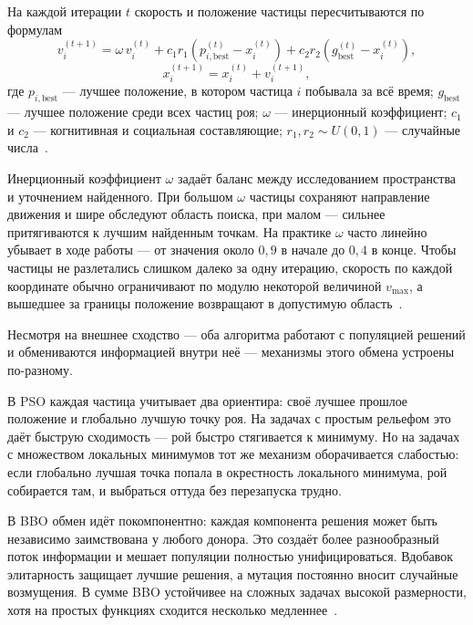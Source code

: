 \documentclass[14pt, a4paper]{extarticle}
\begin{document}
На каждой итерации $t$ скорость и положение частицы пересчитываются по формулам
\begin{equation}\label{eq:pso-velocity}
  v_i^{(t+1)} = \omega\, v_i^{(t)}
  + c_1 r_1 \!\left(p_{i,\text{best}}^{(t)} - x_i^{(t)}\right)
  + c_2 r_2 \!\left(g_{\text{best}}^{(t)} - x_i^{(t)}\right),
\end{equation}
\begin{equation}\label{eq:pso-position}
  x_i^{(t+1)} = x_i^{(t)} + v_i^{(t+1)},
\end{equation}
где $p_{i,\text{best}}$ --- лучшее положение, в котором частица $i$ побывала за всё
время; $g_{\text{best}}$ --- лучшее положение среди всех частиц роя; $\omega$ ---
инерционный коэффициент; $c_1$ и $c_2$ --- когнитивная и социальная составляющие;
$r_1, r_2 \sim U(0,1)$ --- случайные числа~\cite{karpenko2014hybrid}.

Инерционный коэффициент $\omega$ задаёт баланс между исследованием пространства и
уточнением найденного. При большом $\omega$ частицы сохраняют направление движения
и шире обследуют область поиска, при малом --- сильнее притягиваются к лучшим
найденным точкам. На практике $\omega$ часто линейно убывает в ходе работы --- от
значения около $0{,}9$ в начале до $0{,}4$ в конце. Чтобы частицы не разлетались
слишком далеко за одну итерацию, скорость по каждой координате обычно ограничивают
по модулю некоторой величиной $v_{\max}$, а вышедшее за границы положение
возвращают в допустимую область~\cite{pso_review}.

Несмотря на внешнее сходство --- оба алгоритма работают с популяцией решений и
обмениваются информацией внутри неё --- механизмы этого обмена устроены
по-разному.

В PSO каждая частица учитывает два ориентира: своё лучшее прошлое
положение и глобально лучшую точку роя. На задачах с простым рельефом это даёт
быструю сходимость --- рой быстро стягивается к минимуму. Но на задачах с
множеством локальных минимумов тот же механизм оборачивается слабостью: если
глобально лучшая точка попала в окрестность локального минимума, рой собирается
там, и выбраться оттуда без перезапуска трудно.

В BBO обмен идёт покомпонентно: каждая компонента решения может быть независимо
заимствована у любого донора. Это создаёт более разнообразный поток информации и
мешает популяции полностью унифицироваться. Вдобавок элитарность защищает лучшие
решения, а мутация постоянно вносит случайные возмущения. В сумме BBO устойчивее
на сложных задачах высокой размерности, хотя на простых функциях сходится
несколько медленнее~\cite{karpenko2013bbo}.
\end{document}
